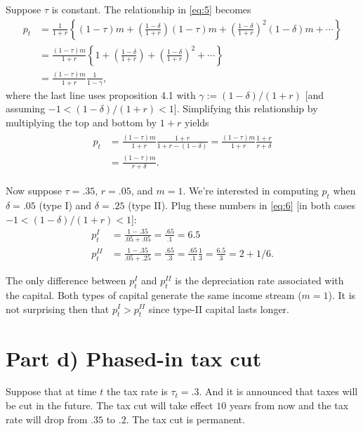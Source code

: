 \documentclass[12pt]{pracjourn_rwr}
\theoremstyle{definition}
\theoremstyle{remark}
\begin{document}
Suppose $\tau$ is constant.
The relationship in \eqref{eq:5} becomes
\begin{align*}
p_{t} &= \frac{1}{1+r} \left\{
(1-\tau)m + \left( \frac{1-\delta}{1+r} \right) (1-\tau)m + \left( \frac{1-\delta}{1+r} \right)^{2}(1-\delta) m + \cdots
\right\} \\
&= \frac{(1-\tau)m}{1+r} \left\{
1 + \left( \frac{1-\delta}{1+r} \right) + \left( \frac{1-\delta}{1+r} \right)^{2} + \cdots
\right\} \\
&= \frac{(1-\tau)m}{1+r} \frac{1}{1 - \gamma},
\end{align*}
where the last line uses proposition 4.1 with $\gamma := (1-\delta)/(1+r)$
[and assuming $-1 < (1-\delta) / (1+r) < 1$].
Simplifying this relationship by multiplying the top and bottom by $1+r$ yields
\begin{align}
\label{eq:6}
\begin{split}
p_{t} &= \frac{(1-\tau)m}{1+r} \frac{1+r}{1+r - (1-\delta)} =
\frac{(1-\tau)m}{1+r} \frac{1+r}{r + \delta} \\
&= \frac{(1-\tau)m}{r+\delta}.
\end{split}
\end{align}

Now suppose $\tau = .35$, $r = .05$, and $m = 1$.
We're interested in computing $p_{t}$ when $\delta = .05$ (type I) and $\delta = .25$ (type II).
Plug these numbers in \eqref{eq:6} [in both cases $-1 < (1-\delta) / (1+r) < 1$]:
\begin{align*}
p^{I}_{t} &= \frac{1-.35}{.05 + .05} = \frac{.65}{.1} = 6.5 \\
p^{II}_{t} &= \frac{1-.35}{.05 + .25} = \frac{.65}{.3} = \frac{.65}{.1} \frac{1}{3} = \frac{6.5}{3} = 2 + 1/6.
\end{align*}

The only difference between $p_{t}^{I}$ and $p_{t}^{II}$ is the depreciation rate associated with the capital.
Both types of capital generate the same income stream ($m = 1$).
It is not surprising then that $p_{t}^{I} > p_{t}^{II}$ since type-II capital lasts longer.

\section{Part d) Phased-in tax cut}

Suppose that at time $t$ the tax rate is $\tau_{t} = .3$.
And it is announced that taxes will be cut in the future.
The tax cut will take effect $10$ years from now and the tax rate will drop from $.35$ to $.2$.
The tax cut is permanent.
\end{document}
